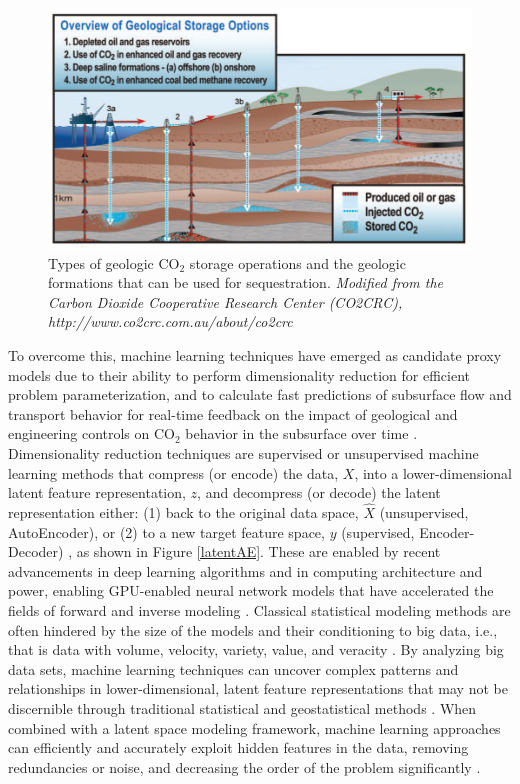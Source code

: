 \documentclass[10pt, twoside]{article}
\begin{document}
\begin{figure}
    \centering
    \includegraphics[width=16cm]{figures/co2types.png}
    \caption{Types of geologic CO$_2$ storage operations and the geologic formations that can be used for sequestration. \textit{Modified from the Carbon Dioxide Cooperative Research Center (CO2CRC), http://www.co2crc.com.au/about/co2crc}}
    \label{co2types}
\end{figure}

To overcome this, machine learning techniques have emerged as candidate proxy models due to their ability to perform dimensionality reduction for efficient problem parameterization, and to calculate fast predictions of subsurface flow and transport behavior for real-time feedback on the impact of geological and engineering controls on CO$_2$ behavior in the subsurface over time \cite{10.30632/SPWLA-2023-0084, Wu2021, Misra2022}. Dimensionality reduction techniques are supervised or unsupervised machine learning methods that compress (or encode) the data, $X$, into a lower-dimensional latent feature representation, $z$, and decompress (or decode) the latent representation either: (1) back to the original data space, $\hat{X}$ (unsupervised, AutoEncoder), or (2) to a new target feature space, $y$ (supervised, Encoder-Decoder) \cite{Liu2022, Canchumuni201987}, as shown in Figure \ref{latentAE}. These are enabled by recent advancements in deep learning algorithms and in computing architecture and power, enabling GPU-enabled neural network models that have accelerated the fields of forward and inverse modeling \cite{Zhang20111631, Yan2022}. Classical statistical modeling methods are often hindered by the size of the models and their conditioning to big data, i.e., that is data with volume, velocity, variety, value, and veracity \cite{tariq2021systematic, MIRZA202227}. By analyzing big data sets, machine learning techniques can uncover complex patterns and relationships in lower-dimensional, latent feature representations that may not be discernible through traditional statistical and geostatistical methods \cite{Brunton2016SparseNLDynamics, FriesChoi2022LaSDI, HeChoi2023gLaSDI}. When combined with a latent space modeling framework, machine learning approaches can efficiently and accurately exploit hidden features in the data, removing redundancies or noise, and decreasing the order of the problem significantly \cite{Liu2020M15, Razak2022}. 
\end{document}
